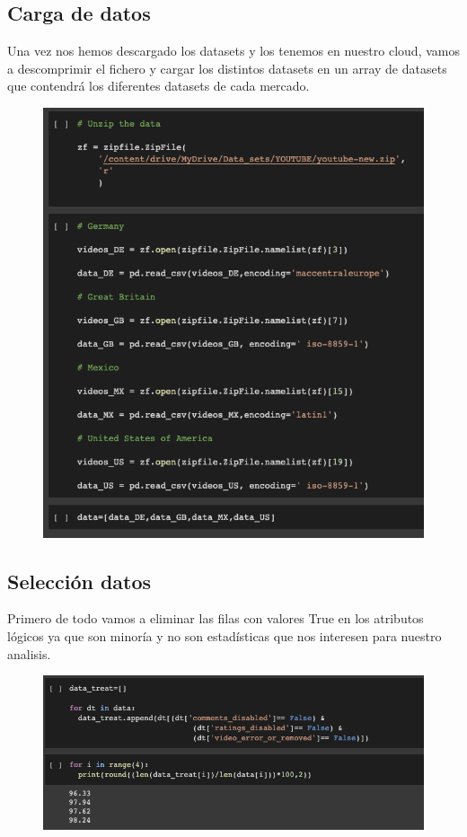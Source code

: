 \documentclass[a4paper,12pt]{article}
\begin{document}
\subsection{Carga de datos}
Una vez nos hemos descargado los datasets y los tenemos en nuestro cloud, vamos a descomprimir el fichero y cargar los distintos datasets en un array de datasets que contendr\'a los diferentes datasets de cada mercado.
\begin{figure}[h!]
\centering
\includegraphics[width=13cm]{data_load.png}
\end{figure}



\subsection{Selecci\'on datos}
Primero de todo vamos a eliminar las filas con valores True en los atributos l\'ogicos ya que son minor\'ia y no son estad\'isticas que nos interesen para nuestro analisis.
\begin{figure}[h!]
\centering
\includegraphics[width=13cm]{data_selection_1.png}
\end{figure}
\end{document}
